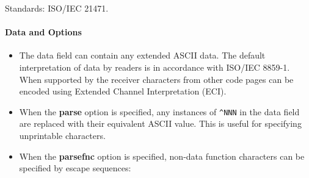 Standards: ISO/IEC 21471.

\hypertarget{data-and-options-11}{%
\paragraph{Data and Options}\label{data-and-options-11}}

\begin{itemize}
\tightlist
\item
  The data field can contain any extended ASCII data. The default
  interpretation of data by readers is in accordance with ISO/IEC
  8859-1. When supported by the receiver characters from other code
  pages can be encoded using Extended Channel Interpretation (ECI).
\item
  When the \textbf{parse} option is specified, any instances of
  \texttt{\^{}NNN} in the data field are replaced with their equivalent
  ASCII value. This is useful for specifying unprintable characters.
\item
  When the \textbf{parsefnc} option is specified, non-data function
  characters can be specified by escape sequences:


\end{itemize}
